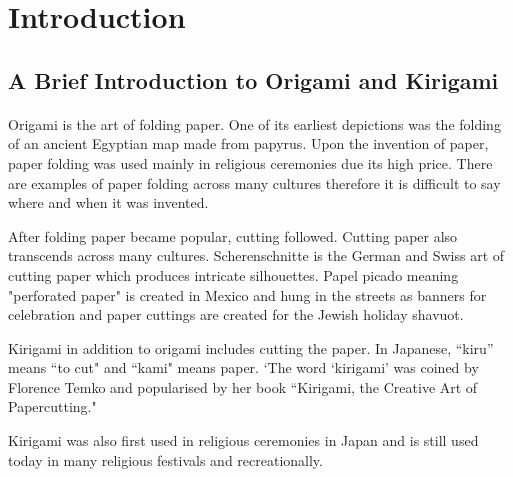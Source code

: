\documentclass[11pt]{article}
\begin{document}
\newpage
\section{Introduction}

        \subsection{A Brief Introduction to Origami and Kirigami}
        
            \paragraph{}
            Origami is the art of folding paper. One of its earliest depictions was the folding of an ancient Egyptian map made from papyrus. Upon the invention of paper, paper folding was used mainly in religious ceremonies due its high price. There are examples of paper folding across many cultures therefore it is difficult to say where and when it was invented. %
            
            After folding paper became popular, cutting followed. Cutting paper also transcends across many cultures. Scherenschnitte is the German and Swiss art of cutting paper which produces intricate silhouettes. %
            Papel picado meaning "perforated paper" is created in Mexico and hung in the streets as banners for celebration
            and paper cuttings are created for the Jewish holiday shavuot. %
            
            
            Kirigami in addition to origami includes cutting the paper. In Japanese, ``kiru'' means ``to cut"
            \cite{Temko2004kirigami} and ``kami" means paper. %
            ‘The word ‘kirigami’ was coined by Florence Temko and popularised by her book ``Kirigami, the Creative Art of Papercutting." %
          
          Kirigami was also first used in religious ceremonies in Japan and is still used today in many religious festivals and recreationally.
           
\end{document}
